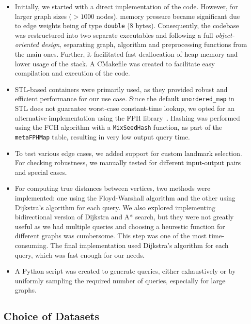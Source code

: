 \documentclass{article}
\begin{document}
\begin{itemize}
    \item Initially, we started with a direct implementation of the code. However, for larger graph sizes ($> 1000$ nodes), memory pressure became significant due to edge weights being of type \texttt{double} (8 bytes). Consequently, the codebase was restructured into two separate executables and following a full \emph{object-oriented design}, separating graph, algorithm and preprocessing functions from the main ones. Further, it facilitated fast deallocation of heap memory and lower usage of the stack. A CMakefile was created to facilitate easy compilation and execution of the code.
    
    \item STL-based containers were primarily used, as they provided robust and efficient performance for our use case. Since the default \texttt{unordered\_map} in STL does not guarantee worst-case constant-time lookup, we opted for an alternative implementation using the FPH library~\cite{fphlib}. Hashing was performed using the FCH algorithm with a \texttt{MixSeedHash} function, as part of the \texttt{metaFPHMap} table, resulting in very low output query time.
    
    \item To test various edge cases, we added support for custom landmark selection. For checking robustness, we manually tested for different input-output pairs and special cases.
    
    \item For computing true distances between vertices, two methods were implemented: one using the Floyd-Warshall algorithm and the other using Dijkstra's algorithm for each query. We also explored implementing bidirectional version of Dijkstra and A* search, but they were not greatly useful as we had multiple queries and choosing a heurestic function for different graphs was cumbersome. This step was one of the most time-consuming. The final implementation used Dijkstra's algorithm for each query, which was fast enough for our needs.
    
    \item A Python script was created to generate queries, either exhaustively or by uniformly sampling the required number of queries, especially for large graphs.
    
\end{itemize}

\subsection*{Choice of Datasets}
\end{document}

